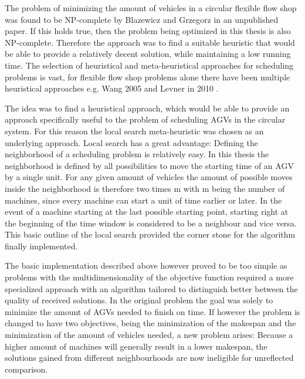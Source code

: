 The problem of minimizing the amount of vehicles in a circular flexible flow shop was found to be NP-complete by Blazewicz and Grzegorz in an unpublished paper. If this
holds true, then the problem being optimized in this thesis is also NP-complete. Therefore the approach was to find a suitable heuristic that would be able to provide a relatively decent
solution, while maintaining a low running time. The selection of heuristical and meta-heuristical approaches for scheduling problems is vast, for
flexible flow shop problems alone there have been multiple heuristical approaches e.g. Wang 2005 \cite{wang2005} and Levner in 2010 \cite{levner2010}.

The idea was to find a heuristical approach, which would be able to provide an approach specifically useful to the problem of scheduling AGVs in the circular system. For this reason
the local search meta-heuristic was chosen as an underlying approach. Local search has a great advantage: Defining the neighborhood of
a scheduling problem is relatively easy. In this thesis the neighborhood is defined by all possibilities to move the starting time of an AGV by
a single unit. For any given amount of vehicles the amount of possible moves inside the neighborhood is therefore two times m with m being the number of machines, since every machine
can start a unit of time earlier or later. In the event of a machine starting at the last possible starting point, starting right at the beginning
of the time window is considered to be a neighbour and vice versa. This basic outline of the local search provided the corner stone for the algorithm
finally implemented. 

The basic implementation described above however proved to be too simple as problems with the multidimensionality of the objective function required a more specialized approach with an algorithm
tailored to distinguish better between the quality of received solutions. In the original problem the goal was solely to minimize the amount of AGVs needed to finish on time. If however the problem is changed to
have two objectives, being the minimization of the makespan and the minimization of the amount of vehicles needed, a new problem arises: 
Because a higher amount of machines will generally result in a lower makespan, the solutions gained from different neighbourhoods are now ineligible for unreflected comparison.

